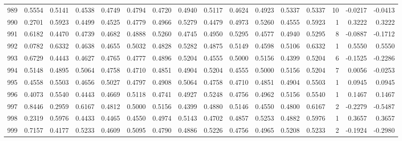 \begin{tabular}{lrrrrrrrrrrrrrrr}
989 &      0.5554 &  0.5141 &  0.4538 &  0.4749 &  0.4794 &  0.4720 &  0.4940 &  0.5117 &  0.4624 &  0.4923 &   0.5337 &     0.5337 &     10 &                   -0.0217 &                    -0.0413 \\
990 &      0.2701 &  0.5923 &  0.4499 &  0.4525 &  0.4779 &  0.4966 &  0.5279 &  0.4479 &  0.4973 &  0.5260 &   0.4555 &     0.5923 &      1 &                    0.3222 &                     0.3222 \\
991 &      0.6182 &  0.4470 &  0.4739 &  0.4682 &  0.4888 &  0.5260 &  0.4745 &  0.4950 &  0.5295 &  0.4577 &   0.4940 &     0.5295 &      8 &                   -0.0887 &                    -0.1712 \\
992 &      0.0782 &  0.6332 &  0.4638 &  0.4655 &  0.5032 &  0.4828 &  0.5282 &  0.4875 &  0.5149 &  0.4598 &   0.5106 &     0.6332 &      1 &                    0.5550 &                     0.5550 \\
993 &      0.6729 &  0.4443 &  0.4627 &  0.4765 &  0.4777 &  0.4896 &  0.5204 &  0.4555 &  0.5000 &  0.5156 &   0.4399 &     0.5204 &      6 &                   -0.1525 &                    -0.2286 \\
994 &      0.5148 &  0.4895 &  0.5064 &  0.4758 &  0.4710 &  0.4851 &  0.4904 &  0.5204 &  0.4555 &  0.5000 &   0.5156 &     0.5204 &      7 &                    0.0056 &                    -0.0253 \\
995 &      0.4558 &  0.5503 &  0.4656 &  0.5027 &  0.4797 &  0.4908 &  0.5064 &  0.4758 &  0.4710 &  0.4851 &   0.4904 &     0.5503 &      1 &                    0.0945 &                     0.0945 \\
996 &      0.4073 &  0.5540 &  0.4443 &  0.4669 &  0.5118 &  0.4741 &  0.4927 &  0.5248 &  0.4756 &  0.4962 &   0.5156 &     0.5540 &      1 &                    0.1467 &                     0.1467 \\
997 &      0.8446 &  0.2959 &  0.6167 &  0.4812 &  0.5000 &  0.5156 &  0.4399 &  0.4880 &  0.5146 &  0.4550 &   0.4800 &     0.6167 &      2 &                   -0.2279 &                    -0.5487 \\
998 &      0.2319 &  0.5976 &  0.4433 &  0.4465 &  0.4550 &  0.4974 &  0.5143 &  0.4702 &  0.4857 &  0.5253 &   0.4882 &     0.5976 &      1 &                    0.3657 &                     0.3657 \\
999 &      0.7157 &  0.4177 &  0.5233 &  0.4609 &  0.5095 &  0.4790 &  0.4886 &  0.5226 &  0.4756 &  0.4965 &   0.5208 &     0.5233 &      2 &                   -0.1924 &                    -0.2980 \\
\bottomrule
\end{tabular}

